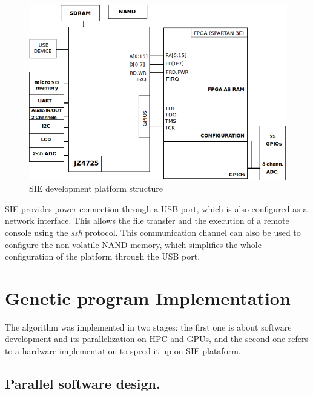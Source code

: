 \documentclass[runningheads,a4paper]{llncs}
\begin{document}
\begin{figure}[htpb]
   \begin{center} \includegraphics[scale=.45]{./images/SAKC_block_diagram.png}   \end{center}
    \caption{SIE development platform structure} \label{SIE_arch}
\end{figure}

SIE provides power connection through a USB port, which is also configured as a network interface. This allows the file transfer and the execution of a remote console using the \textit{ssh} protocol. This communication channel can also be used to configure the non-volatile NAND memory, which simplifies the whole configuration of the platform through the USB port.


\section{Genetic program Implementation} 
The algorithm was implemented in two stages: the first one is about software development and its parallelization on HPC and GPUs, and the second one refers to a hardware implementation to speed it up on SIE plataform.

\subsection{Parallel software design.}
\end{document}
